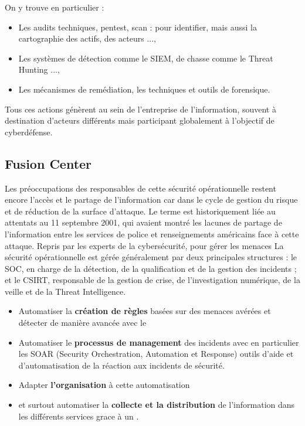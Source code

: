 On y trouve en particulier : 

\begin{itemize}
  \item Les audits techniques, pentest, scan : pour identifier, mais aussi la cartographie des actifs, des acteurs ...,
  \item Les systèmes de détection comme le SIEM, de chasse comme le Threat Hunting ...,
  \item Les mécanismes de remédiation, les techniques et outils de forensique.
\end{itemize}

Tous ces actions génèrent au sein de l'entreprise de l'information, souvent à destination d'acteurs différents mais participant globalement à l'objectif de cyberdéfense.

\subsection{Fusion Center}

Les préoccupations des responsables de cette sécurité opérationnelle restent encore l'accès et le partage de l'information car dans le cycle de gestion du risque et de réduction de la surface d'attaque. Le terme  est historiquement liée au attentats au 11 septembre 2001, qui avaient montré les lacunes de partage de l'information entre les services de police et renseignements américains face à cette attaque. Repris par les experts de la cybersécurité, pour gérer les menaces 
La sécurité opérationnelle est gérée généralement par deux principales structures : le SOC, en charge de la détection, de la qualification et de la gestion des incidents ; et le CSIRT, responsable de la gestion de crise, de l’investigation numérique, de la veille et de la Threat Intelligence.



\begin{itemize}
  \item Automatiser la \textbf{création de règles} basées sur des menaces avérées  et détecter de manière avancée avec le 
  \item Automatiser le \textbf{processus de management }des incidents avec en  particulier les SOAR (Security Orchestration, Automation et Response) outils d’aide et d’automatisation de la réaction aux incidents de sécurité.
  \item Adapter \textbf{l’organisation} à cette automatisation
  \item et surtout automatiser la \textbf{collecte et la distribution} de l'information dans les différents services grace à un .
\end{itemize}


